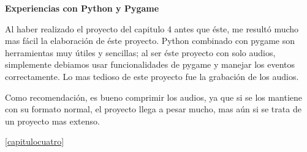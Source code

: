 \documentclass[12pt]{report}
\begin{document}

	\begingroup
		\large{
			\textbf{
				\newline
				\newline
				\newline
				Experiencias con Python y Pygame
				\newline
				\newline
			}
		}
	\endgroup

Al haber realizado el proyecto del capitulo 4 antes que éste, me resultó mucho mas fácil la elaboración de éste proyecto.
Python combinado con pygame son herramientas muy útiles y sencillas; al ser éste proyecto con solo audios, simplemente debiamos usar funcionalidades de pygame y manejar los eventos correctamente.
Lo mas tedioso de este proyecto fue la grabación de los audios.

Como recomendación, es bueno comprimir los audios, ya que si se los mantiene con su formato normal, el proyecto llega a pesar mucho, mas aún si se trata de un proyecto mas extenso.



 \ref{capitulocuatro}
\end{document}
